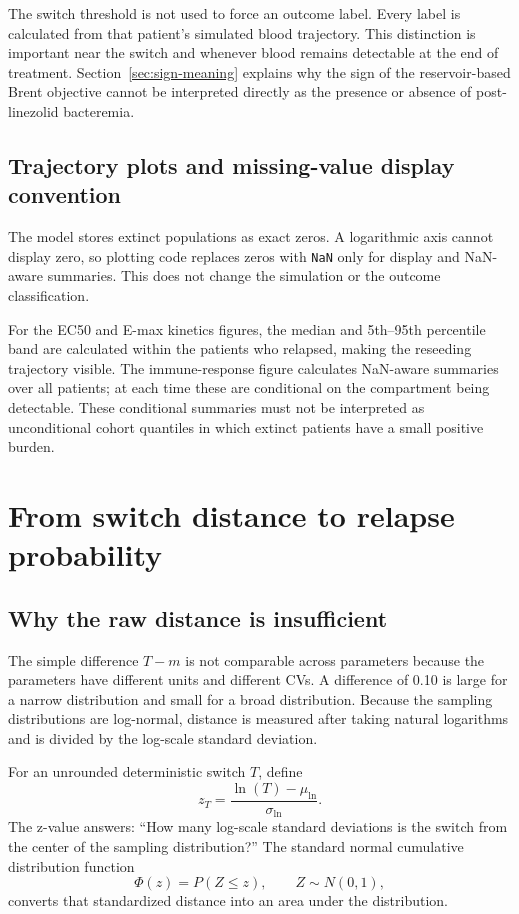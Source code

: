 \documentclass[11pt]{article}
\begin{document}
The switch threshold is not used to force an outcome label. Every label is
calculated from that patient's simulated blood trajectory. This distinction
is important near the switch and whenever blood remains detectable at the end
of treatment. Section~\ref{sec:sign-meaning} explains why the sign of the
reservoir-based Brent objective cannot be interpreted directly as the presence
or absence of post-linezolid bacteremia.

\subsection{Trajectory plots and missing-value display convention}

The model stores extinct populations as exact zeros. A logarithmic axis cannot
display zero, so plotting code replaces zeros with \texttt{NaN} only for
display and NaN-aware summaries. This does not change the simulation or the
outcome classification.

For the EC50 and E-max kinetics figures, the median and 5th--95th percentile
band are calculated within the patients who relapsed, making the reseeding
trajectory visible. The immune-response figure calculates NaN-aware summaries
over all patients; at each time these are conditional on the compartment being
detectable. These conditional summaries must not be interpreted as
unconditional cohort quantiles in which extinct patients have a small positive
burden.

\section{From switch distance to relapse probability}

\subsection{Why the raw distance is insufficient}

The simple difference $T-m$ is not comparable across parameters because the
parameters have different units and different CVs. A difference of 0.10 is
large for a narrow distribution and small for a broad distribution. Because
the sampling distributions are log-normal, distance is measured after taking
natural logarithms and is divided by the log-scale standard deviation.

For an unrounded deterministic switch $T$, define
\begin{equation}
z_T=\frac{\ln(T)-\mu_{\ln}}{\sigma_{\ln}}.
\label{eq:z}
\end{equation}
The z-value answers: ``How many log-scale standard deviations is the switch
from the center of the sampling distribution?'' The standard normal
cumulative distribution function
\begin{equation}
\Phi(z)=P(Z\leq z),\qquad Z\sim N(0,1),
\end{equation}
converts that standardized distance into an area under the distribution.
\end{document}
